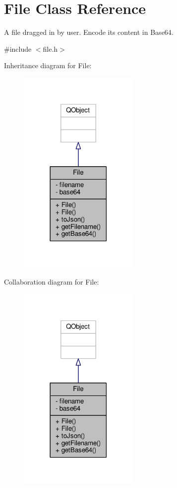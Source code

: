 \hypertarget{classFile}{}\section{File Class Reference}
\label{classFile}


A file dragged in by user. Encode its content in Base64.  




{\ttfamily \#include $<$file.\+h$>$}



Inheritance diagram for File\+:
\nopagebreak
\begin{figure}[H]
\begin{center}
\leavevmode
\includegraphics[width=165pt]{classFile__inherit__graph}
\end{center}
\end{figure}


Collaboration diagram for File\+:
\nopagebreak
\begin{figure}[H]
\begin{center}
\leavevmode
\includegraphics[width=165pt]{classFile__coll__graph}
\end{center}
\end{figure}
